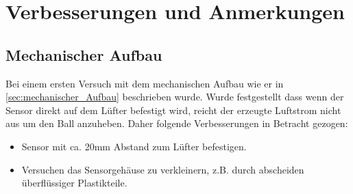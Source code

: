 


\chapter{Verbesserungen und Anmerkungen}
\section{Mechanischer Aufbau}
Bei einem ersten Versuch mit dem mechanischen Aufbau wie er in \ref{sec:mechanischer_Aufbau} beschrieben wurde. Wurde festgestellt dass wenn der Sensor direkt auf dem Lüfter befestigt wird, reicht der erzeugte Luftstrom nicht aus um den Ball anzuheben. Daher folgende Verbesserungen in Betracht gezogen:
\begin{itemize}
	\item Sensor mit ca. 20mm Abstand zum Lüfter befestigen.
	\item Versuchen das Sensorgehäuse zu verkleinern, z.B. durch abscheiden überflüssiger Plastikteile.
\end{itemize}